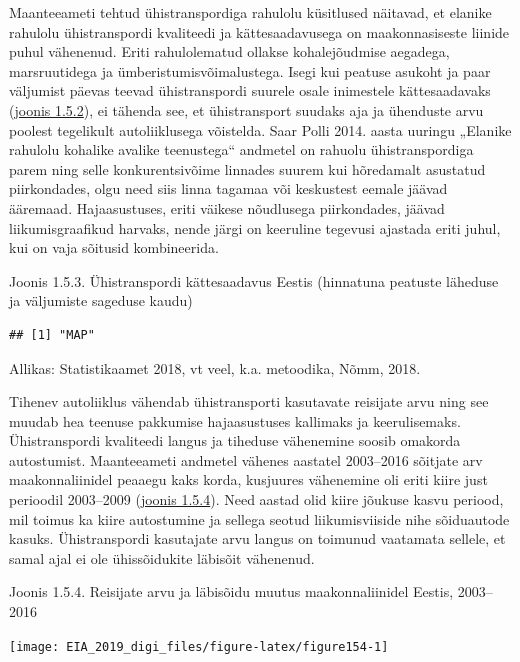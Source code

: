 \documentclass[estonian,]{article}
\begin{document}
Maanteeameti tehtud ühistranspordiga rahulolu küsitlused näitavad, et elanike rahulolu ühistranspordi kvaliteedi ja kättesaadavusega on maakonnasiseste liinide puhul vähenenud. Eriti rahulolematud ollakse kohalejõudmise aegadega, marsruutidega ja ümberistumisvõimalustega. Isegi kui peatuse asukoht ja paar väljumist päevas teevad ühistranspordi suurele osale inimestele kättesaadavaks (\protect\hyperlink{figure152}{joonis 1.5.2}), ei tähenda see, et ühistransport suudaks aja ja ühenduste arvu poolest tegelikult autoliiklusega võistelda. Saar Polli 2014. aasta uuringu „Elanike rahulolu kohalike avalike teenustega`` andmetel on rahuolu ühistranspordiga parem ning selle konkurentsivõime linnades suurem kui hõredamalt asustatud piirkondades, olgu need siis linna tagamaa või keskustest eemale jäävad ääremaad. Hajaasustuses, eriti väikese nõudlusega piirkondades, jäävad liikumisgraafikud harvaks, nende järgi on keeruline tegevusi ajastada eriti juhul, kui on vaja sõitusid kombineerida.

{Joonis 1.5.3.} Ühistranspordi kättesaadavus Eestis (hinnatuna peatuste läheduse ja väljumiste sageduse kaudu)

\begin{verbatim}
## [1] "MAP"
\end{verbatim}

\begin{imgsource}
{Allikas:} Statistikaamet 2018, vt veel, k.a. metoodika, Nõmm, 2018.
\end{imgsource}

Tihenev autoliiklus vähendab ühistransporti kasutavate reisijate arvu ning see muudab hea teenuse pakkumise hajaasustuses kallimaks ja keerulisemaks. Ühistranspordi kvaliteedi langus ja tiheduse vähenemine soosib omakorda autostumist. Maanteeameti andmetel vähenes aastatel 2003--2016 sõitjate arv maakonnaliinidel peaaegu kaks korda, kusjuures vähenemine oli eriti kiire just perioodil 2003--2009 (\protect\hyperlink{figure154}{joonis 1.5.4}). Need aastad olid kiire jõukuse kasvu periood, mil toimus ka kiire autostumine ja sellega seotud liikumisviiside nihe sõiduautode kasuks. Ühistranspordi kasutajate arvu langus on toimunud vaatamata sellele, et samal ajal ei ole ühissõidukite läbisõit vähenenud.

{Joonis 1.5.4.} Reisijate arvu ja läbisõidu muutus maakonnaliinidel Eestis, 2003--2016

\begin{center}\texttt{[image: EIA\_2019\_digi\_files/figure-latex/figure154-1]} \end{center}
\end{document}
